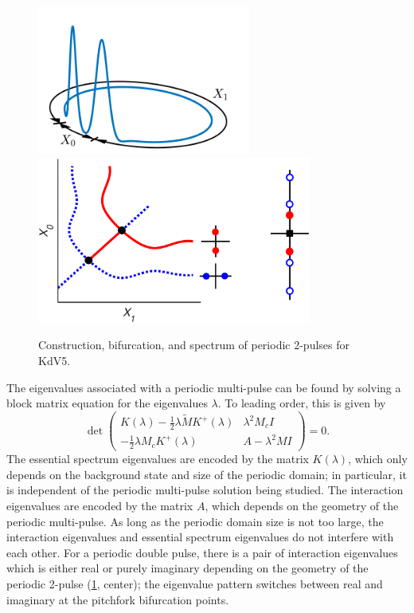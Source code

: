 \documentclass[12pt,reqno,oneside,hidelinks]{article}
\begin{document}
\begin{figure}
    \begin{center}
    \includegraphics[width=7cm]{images/2pulse3d.png} \hspace{-1cm}
    \includegraphics[width=9cm]{images/2pitchforkcoloreig2.eps}
    \end{center}
    \caption{Construction, bifurcation, and spectrum of periodic 2-pulses for KdV5.}
    \label{fig:periodic}
\end{figure}
    
The eigenvalues associated with a periodic multi-pulse can be found by solving a block matrix equation \cite[Theorem 5.3]{ParkerKdV} for the eigenvalues $\lambda$. To leading order, this is given by
    \begin{equation}\label{blockmatrix}
    \det \begin{pmatrix}
    K(\lambda) - \frac{1}{2} \lambda \tilde{M} K^+(\lambda) & \lambda^2 M_c I \\
    -\frac{1}{2} \lambda M_c K^+(\lambda) & A - \lambda^2 MI  
    \end{pmatrix} = 0.
    \end{equation}
The essential spectrum eigenvalues are encoded by the matrix $K(\lambda)$, which only depends on the background state and size of the periodic domain; in particular, it is independent of the periodic multi-pulse solution being studied. The interaction eigenvalues are encoded by the matrix $A$, which depends on the geometry of the periodic multi-pulse. As long as the periodic domain size is not too large, the interaction eigenvalues and essential spectrum eigenvalues do not interfere with each other. For a periodic double pulse, there is a pair of interaction eigenvalues which is either real or purely imaginary depending on the geometry of the periodic 2-pulse (\cref{fig:periodic}, center); the eigenvalue pattern switches between real and imaginary at the pitchfork bifurcation points.  
    
\end{document}
